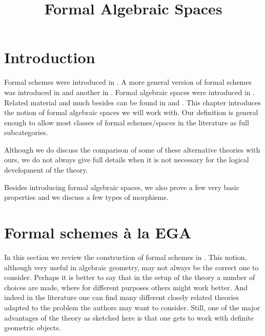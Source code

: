 \documentclass{stacks-project}
\theoremstyle{plain}
\theoremstyle{definition}
\theoremstyle{remark}
\numberwithin{equation}{subsection}
\begin{document}
\title{Formal Algebraic Spaces}


\maketitle

\label{section-phantom}

\tableofcontents

\section{Introduction}
\label{section-introduction}

\noindent
Formal schemes were introduced in \cite{EGA}. A more general version
of formal schemes was introduced in \cite{McQuillan} and another
in \cite{Yasuda}. Formal algebraic spaces were introduced in \cite{Kn}.
Related material and much besides can be found in
\cite{Abbes} and \cite{Fujiwara-Kato}.
This chapter introduces the notion of formal algebraic spaces
we will work with. Our definition is general enough to allow most
classes of formal schemes/spaces in the literature as full subcategories.

\medskip\noindent
Although we do discuss the comparison of some of these alternative theories
with ours, we do not always give full details when it is not necessary for
the logical development of the theory.

\medskip\noindent
Besides introducing formal algebraic spaces, we also prove a few very
basic properties and we discuss a few types of morphisms.










\section{Formal schemes \`a la EGA}
\label{section-formal-schemes-EGA}

\noindent
In this section we review the construction of formal schemes in \cite{EGA}.
This notion, although very useful in algebraic geometry,
may not always be the correct one to consider. Perhaps it is better to say
that in the setup of the theory a number of choices are made, where for
different purposes others might work better. And indeed in the literature
one can find many different closely related theories
adapted to the problem the authors may want to consider. Still, one
of the major advantages of the theory as sketched here is that one
gets to work with definite geometric objects.
\end{document}

